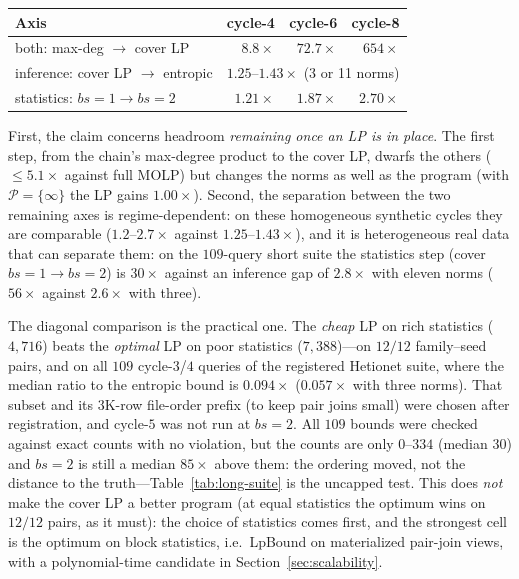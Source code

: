 \documentclass[conference]{IEEEtran}
\begin{document}
\begin{center}\small
\begin{tabular}{@{}lrrr@{}}
\toprule
Axis & cycle-4 & cycle-6 & cycle-8 \\
\midrule
both: max-deg $\to$ cover LP & $8.8\times$ & $72.7\times$ & $654\times$ \\
inference: cover LP $\to$ entropic & \multicolumn{3}{c}{$1.25$--$1.43\times$ (3 or 11 norms)} \\
statistics: $bs{=}1 \to bs{=}2$ & $1.21\times$ & $1.87\times$ & $2.70\times$ \\
\bottomrule
\end{tabular}
\end{center}

First, the claim concerns headroom \emph{remaining once an LP is in
place}. The first step, from the chain's max-degree product to the cover LP, dwarfs the others (${\le}5.1\times$ against full MOLP) but changes the norms as well as the program (with $\mathcal{P}=\{\infty\}$ the LP gains $1.00\times$).
Second, the separation between the two remaining axes is
regime-dependent: on these homogeneous synthetic cycles they are
comparable ($1.2$--$2.7\times$ against $1.25$--$1.43\times$), and it is
heterogeneous real data that can separate them: on the $109$-query
short suite the statistics step (cover $bs{=}1\to bs{=}2$) is
$30\times$ against an inference gap of $2.8\times$ with eleven norms ($56\times$ against
$2.6\times$ with three).

The diagonal comparison is the practical one. The \emph{cheap} LP on rich
statistics ($4{,}716$) beats the \emph{optimal} LP on poor statistics
($7{,}388$)---on $12/12$ family--seed pairs, and on all $109$ cycle-$3$/$4$
queries of the registered Hetionet suite, where the median ratio to the
entropic bound is $0.094\times$ ($0.057\times$ with three norms). That subset and its $3$K-row file-order
prefix (to keep pair joins small) were chosen after registration, and
cycle-$5$ was not run at $bs{=}2$. All $109$ bounds were checked against
exact counts with no violation, but the counts are only $0$--$334$
(median $30$) and $bs{=}2$ is still a median $85\times$ above them: the
ordering moved, not the distance to the truth---Table~\ref{tab:long-suite}
is the uncapped test. This does \emph{not} make the cover LP a better program (at equal statistics the optimum wins on $12/12$ pairs, as it must): the choice of statistics comes first, and the strongest cell is the optimum on block statistics, i.e.\ LpBound on materialized pair-join views, with a polynomial-time candidate in Section~\ref{sec:scalability}.
\end{document}
